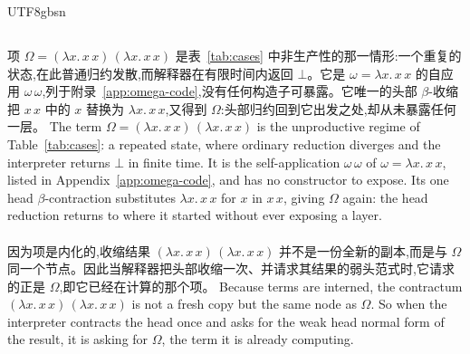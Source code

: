 \begin{CJK*}{UTF8}{gbsn}
  \subsection{}\label{sec:application-bottom}

  \ifTablambdaChinese
  项 $\Omega = (\lambda x.\,x\,x)\,(\lambda x.\,x\,x)$ 是表~\ref{tab:cases} 中非生产性的那一情形:一个重复的状态,在此普通归约发散,而解释器在有限时间内返回 $\bot$。它是 $\omega = \lambda x.\,x\,x$ 的自应用 $\omega\,\omega$,列于附录~\ref{app:omega-code},没有任何构造子可暴露。它唯一的头部 $\beta$-收缩把 $x\,x$ 中的 $x$ 替换为 $\lambda x.\,x\,x$,又得到 $\Omega$:头部归约回到它出发之处,却从未暴露任何一层。
  \else
  The term $\Omega = (\lambda x.\,x\,x)\,(\lambda x.\,x\,x)$ is the unproductive regime of Table~\ref{tab:cases}: a repeated state, where ordinary reduction diverges and the interpreter returns $\bot$ in finite time. It is the self-application $\omega\,\omega$ of $\omega = \lambda x.\,x\,x$, listed in Appendix~\ref{app:omega-code}, and has no constructor to expose. Its one head $\beta$-contraction substitutes $\lambda x.\,x\,x$ for $x$ in $x\,x$, giving $\Omega$ again: the head reduction returns to where it started without ever exposing a layer.
  \fi

  \paragraph{}
  \ifTablambdaChinese
  因为项是内化的,收缩结果 $(\lambda x.\,x\,x)\,(\lambda x.\,x\,x)$ 并不是一份全新的副本,而是与 $\Omega$ 同一个节点。因此当解释器把头部收缩一次、并请求其结果的弱头范式时,它请求的正是 $\Omega$,即它已经在计算的那个项。
  \else
  Because terms are interned, the contractum $(\lambda x.\,x\,x)\,(\lambda x.\,x\,x)$ is not a fresh copy but the same node as $\Omega$. So when the interpreter contracts the head once and asks for the weak head normal form of the result, it is asking for $\Omega$, the term it is already computing.
  \fi


\end{CJK*}
